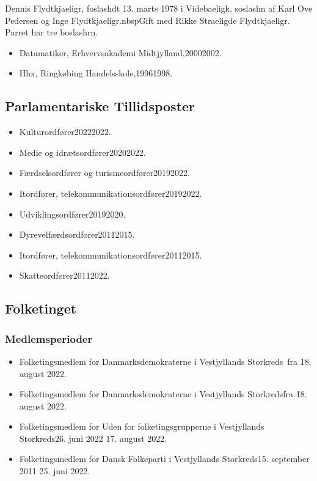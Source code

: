 \documentclass[11pt, a4paper]{awesome-cv}
\begin{document}
\makecvheader[R]
\makelettertitle
\begin{cvletter}
Dennis Flydtkjaeligr, foslashdt 13. marts 1978 i Videbaeligk, soslashn af Karl Ove Pedersen og Inge Flydtkjaeligr.nbspGift med Rikke Straeligde Flydtkjaeligr. Parret har tre boslashrn.

\begin{itemize}
\item Datamatiker, Erhvervsakademi Midtjylland,20002002.
\item Hhx, Ringkøbing Handelsskole,19961998.
\end{itemize}
\subsection*{Parlamentariske Tillidsposter}
\begin{itemize}
\item Kulturordfører20222022.
\item Medie og idrætsordfører20202022.
\item Færdselsordfører og turismeordfører20192022.
\item Itordfører, telekommunikationsordfører20192022.
\item Udviklingsordfører20192020.
\item Dyrevelfærdsordfører20112015.
\item Itordfører, telekommunikationsordfører20112015.
\item Skatteordfører20112022.
\end{itemize}
\subsection*{Folketinget}
\subsubsection*{Medlemsperioder}
\begin{itemize}
\item Folketingsmedlem for Danmarksdemokraterne i Vestjyllands Storkreds fra 18. august 2022.
\item Folketingsmedlem for Danmarksdemokraterne i Vestjyllands Storkredsfra 18. august 2022.
\item Folketingsmedlem for Uden for folketingsgrupperne i Vestjyllands Storkreds26. juni 2022  17. august 2022.
\item Folketingsmedlem for Dansk Folkeparti i Vestjyllands Storkreds15. september 2011  25. juni 2022.
\end{itemize}

\end{cvletter}
\end{document}
